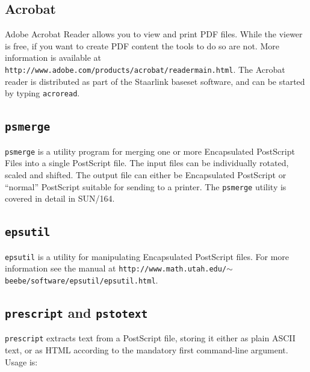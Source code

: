 \documentclass[twoside,11pt]{article}
\newcommand{\htmladdnormallink}[2]{#1}
\newcommand{\xref}[3]{#1}
\newcommand{\xlabel}[1]{}
\begin{document}
\subsection{\xlabel{sc15_acrobat}Acrobat\label{sc15_acrobat}}

Adobe \htmladdnormallink{Acrobat Reader}{http://www.adobe.com/products/acrobat/readstep.html} allows you to view and print PDF files. While the viewer is free, if you want to create PDF content the tools to do so are not. More information is available at \htmladdnormallink{{\tt http://www.adobe.com/products/acrobat/readermain.html}}{http://www.adobe.com/products/acrobat/readermain.html}. The Acrobat reader is distributed as part of the Staarlink baseset software, and can be started by typing {\tt acroread}.

\subsection{\xlabel{sc15_psmerge}{\tt psmerge}\label{sc15_psmerge}}

\xref{{\tt psmerge}}{sun164}{} is a utility program for merging one or more Encapsulated PostScript Files into a single PostScript file. The input files can be individually rotated, scaled and shifted. The output file can either be Encapsulated PostScript or ``normal'' PostScript suitable for sending to a printer. The {\tt psmerge} utility is covered in detail in \xref{SUN/164}{sun164}{}.

\subsection{{\tt epsutil}}

\htmladdnormallink{{\tt epsutil}}{http://www.math.utah.edu/~beebe/software/epsutil/epsutil.html} is a utility for manipulating Encapsulated PostScript files. For more information see the manual at \htmladdnormallink{{\tt http://www.math.utah.edu/$\sim$beebe/software/epsutil/epsutil.html}}{http://www.math.utah.edu/~beebe/software/epsutil/epsutil.html}.

\subsection{{\tt prescript} and {\tt pstotext}}

{\tt prescript} extracts text from a PostScript file, storing it either as plain ASCII text, or as HTML according to the mandatory first command-line argument. Usage is:
\end{document}
